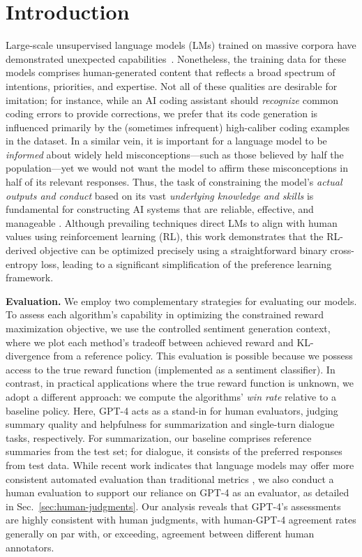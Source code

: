 \section{Introduction}
Large-scale unsupervised language models (LMs) trained on massive corpora have demonstrated unexpected capabilities~\citep{chowdhery2022palm, brown2020language, touvron2023llama,bubeck2023sparks}. Nonetheless, the training data for these models comprises human-generated content that reflects a broad spectrum of intentions, priorities, and expertise. Not all of these qualities are desirable for imitation; for instance, while an AI coding assistant should \textit{recognize} common coding errors to provide corrections, we prefer that its code generation is influenced primarily by the (sometimes infrequent) high-caliber coding examples in the dataset. In a similar vein, it is important for a language model to be \textit{informed} about widely held misconceptions—such as those believed by half the population—yet we would not want the model to affirm these misconceptions in half of its relevant responses. Thus, the task of constraining the model’s \emph{actual outputs and conduct} based on its vast \textit{underlying knowledge and skills} is fundamental for constructing AI systems that are reliable, effective, and manageable \citep{ouyang2022training}. Although prevailing techniques direct LMs to align with human values using reinforcement learning (RL), this work demonstrates that the RL-derived objective can be optimized precisely using a straightforward binary cross-entropy loss, leading to a significant simplification of the preference learning framework.

\textbf{Evaluation.} We employ two complementary strategies for evaluating our models. To assess each algorithm's capability in optimizing the constrained reward maximization objective, we use the controlled sentiment generation context, where we plot each method's tradeoff between achieved reward and KL-divergence from a reference policy. This evaluation is possible because we possess access to the true reward function (implemented as a sentiment classifier). In contrast, in practical applications where the true reward function is unknown, we adopt a different approach: we compute the algorithms’ \textit{win rate} relative to a baseline policy. Here, GPT-4 acts as a stand-in for human evaluators, judging summary quality and helpfulness for summarization and single-turn dialogue tasks, respectively. For summarization, our baseline comprises reference summaries from the test set; for dialogue, it consists of the preferred responses from test data. While recent work indicates that language models may offer more consistent automated evaluation than traditional metrics \citep{Chen2023ExploringTU}, we also conduct a human evaluation to support our reliance on GPT-4 as an evaluator, as detailed in Sec.~\ref{sec:human-judgments}. Our analysis reveals that GPT-4's assessments are highly consistent with human judgments, with human-GPT-4 agreement rates generally on par with, or exceeding, agreement between different human annotators.

